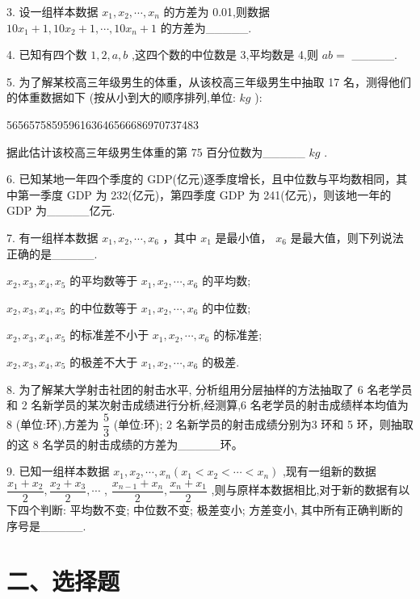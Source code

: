 3. 设一组样本数据 ${x}_{1},{x}_{2},\cdots ,{x}_{n}$ 的方差为 0.01,则数据 ${10}{x}_{1} + 1,{10}{x}_{2} + 1,\cdots ,{10}{x}_{n} + 1$ 的方差为\_\_\_\_\_.

4. 已知有四个数 $1,2,a,b$ ,这四个数的中位数是 3,平均数是 4,则 ${ab} =$ \_\_\_\_\_.

5. 为了解某校高三年级男生的体重，从该校高三年级男生中抽取 17 名，测得他们的体重数据如下 (按从小到大的顺序排列,单位: ${{kg}}$ ):

5656575859596163646566686970737483

据此估计该校高三年级男生体重的第 75 百分位数为\_\_\_\_\_ ${{kg}}$ .

6. 已知某地一年四个季度的 GDP(亿元)逐季度增长，且中位数与平均数相同，其中第一季度 GDP 为 232(亿元)，第四季度 GDP 为 241(亿元)，则该地一年的 GDP 为\_\_\_\_\_亿元.

7. 有一组样本数据 ${x}_{1},{x}_{2},\cdots ,{x}_{6}$ ，其中 ${x}_{1}$ 是最小值， ${x}_{6}$ 是最大值，则下列说法正确的是\_\_\_\_\_.

   ${x}_{2},{x}_{3},{x}_{4},{x}_{5}$ 的平均数等于 ${x}_{1},{x}_{2},\cdots ,{x}_{6}$ 的平均数;

   ${x}_{2},{x}_{3},{x}_{4},{x}_{5}$ 的中位数等于 ${x}_{1},{x}_{2},\cdots ,{x}_{6}$ 的中位数;

   ${x}_{2},{x}_{3},{x}_{4},{x}_{5}$ 的标准差不小于 ${x}_{1},{x}_{2},\cdots ,{x}_{6}$ 的标准差;

   ${x}_{2},{x}_{3},{x}_{4},{x}_{5}$ 的极差不大于 ${x}_{1},{x}_{2},\cdots ,{x}_{6}$ 的极差.

8. 为了解某大学射击社团的射击水平, 分析组用分层抽样的方法抽取了 6 名老学员和 2 名新学员的某次射击成绩进行分析,经测算,6 名老学员的射击成绩样本均值为 8 (单位:环),方差为 $\dfrac{5}{3}$ (单位:环); 2 名新学员的射击成绩分别为3 环和 5 环，则抽取的这 8 名学员的射击成绩的方差为\_\_\_\_\_环。

9. 已知一组样本数据 ${x}_{1},{x}_{2},\cdots ,{x}_{n}\left( {{x}_{1} < {x}_{2} < \cdots  < {x}_{n}}\right)$ ,现有一组新的数据 $\dfrac{{x}_{1} + {x}_{2}}{2},\dfrac{{x}_{2} + {x}_{3}}{2},\cdots$ , $\dfrac{{x}_{n - 1} + {x}_{n}}{2},\dfrac{{x}_{n} + {x}_{1}}{2}$ ,则与原样本数据相比,对于新的数据有以下四个判断:   平均数不变;   中位数不变;    极差变小;   方差变小, 其中所有正确判断的序号是\_\_\_\_\_.

\section*{二、选择题}

